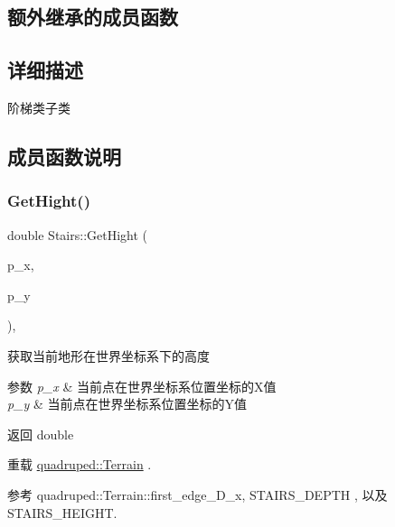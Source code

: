 \subsection*{额外继承的成员函数}


\subsection{详细描述}
阶梯类子类 

\subsection{成员函数说明}
\mbox{\label{classquadruped_1_1Stairs_a648ed016d7ba3648e27ecd7eecdb3ab2}} 
\subsubsection{\texorpdfstring{Get\+Hight()}{GetHight()}}
{\footnotesize\ttfamily double Stairs\+::\+Get\+Hight (\begin{DoxyParamCaption}\item[{double}]{p\+\_\+x,  }\item[{double}]{p\+\_\+y }\end{DoxyParamCaption})\hspace{0.3cm}{\ttfamily [override]}, {\ttfamily [virtual]}}



获取当前地形在世界坐标系下的高度 


\begin{DoxyParams}{参数}
{\em p\+\_\+x} & 当前点在世界坐标系位置坐标的\+X值 \\
\hline
{\em p\+\_\+y} & 当前点在世界坐标系位置坐标的\+Y值 \\
\hline
\end{DoxyParams}
\begin{DoxyReturn}{返回}
double 
\end{DoxyReturn}


重载 \hyperlink{classquadruped_1_1Terrain}{quadruped\+::\+Terrain} .



参考 quadruped\+::\+Terrain\+::first\+\_\+edge\+\_\+\+D\+\_\+x, S\+T\+A\+I\+R\+S\+\_\+\+D\+E\+P\+TH , 以及 S\+T\+A\+I\+R\+S\+\_\+\+H\+E\+I\+G\+HT.

\mbox{\label{classquadruped_1_1Stairs_ac14852afde37318cf3390c4090a991f1}} 
